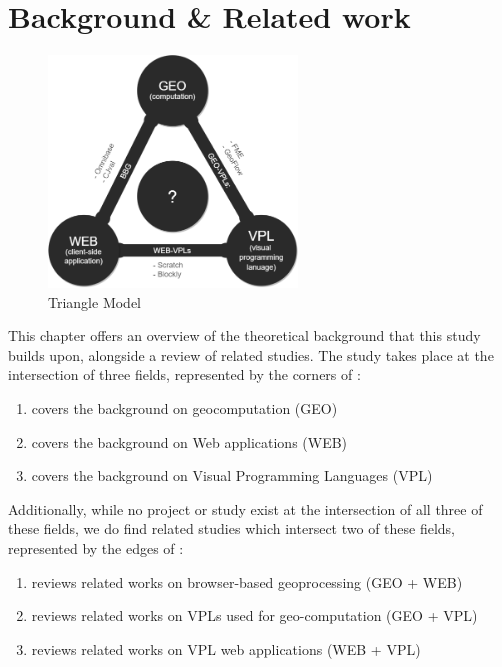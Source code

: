 
\chapter{Background \& Related work}
\label{chap:related}

\begin{figure}
  \centering
  \graphicspath{ {../../assets/diagrams/} }
  \includegraphics[width=250px]{geo-web-vpl.png}
  \caption{Triangle Model}
  \label{fig:triangle-model}
\end{figure}

This chapter offers an overview of the theoretical background that this study builds upon, alongside a review of related studies.
The study takes place at the intersection of three fields, represented by the corners of :
\begin{enumerate}[-]
  \item {} covers the background on geocomputation (GEO) 
  \item {} covers the background on Web applications (WEB)
  \item {} covers the background on Visual Programming Languages (VPL) 
\end{enumerate}

Additionally, while no project or study exist at the intersection of all three of these fields, we do find related studies which intersect two of these fields, represented by the edges of :
\begin{enumerate}[-]
  \item {} reviews related works on browser-based geoprocessing (GEO + WEB)
  \item {} reviews related works on VPLs used for geo-computation (GEO + VPL)
  \item {} reviews related works on VPL web applications (WEB + VPL)
\end{enumerate}

